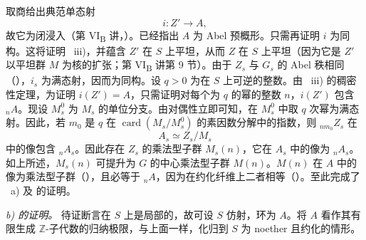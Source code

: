 取商给出典范单态射
\[
  i:Z'\longrightarrow A,
\]
故它为闭浸入（第 VI\textsubscript{B} 讲，）。已经指出 \(A\) 为 Abel 预概形。只需再证明 \(i\) 为同构。这将证明 ~iii)，并蕴含 \(Z'\) 在 \(S\) 上平坦，从而 \(Z\) 在 \(S\) 上平坦（因为它是 \(Z'\) 以平坦群 \(M\) 为核的扩张；第 VI\textsubscript{B} 讲第 9 节）。由于 \(Z_s\) 与 \(G_s\) 的 Abel 秩相同（），\(i_s\) 为满态射，因而为同构。设 \(q>0\) 为在 \(S\) 上可逆的整数。由 ~iii) 的稠密性定理，为证明 \(i(Z')=A\)，只需证明对每个为 \(q\) 的幂的整数 \(n\)，\(i(Z')\) 包含 \({}_nA\)。现设 \(M_s^0\) 为 \(M_s\) 的单位分支。由对偶性立即可知，在 \(M_s^0\) 中取 \(q\) 次幂为满态射。因此，若 \(m_0\) 是 \(q\) 在 \(\operatorname{card}(M_s/M_s^0)\) 的素因数分解中的指数，则 \({}_{nm_0}Z_s\) 在
\[
  A_s\simeq Z_s/M_s
\]
中的像包含 \({}_nA_s\)。因此存在 \(Z_s\) 的乘法型子群 \(M_s(n)\)，它在 \(A_s\) 中的像为 \({}_nA_s\)。如上所述，\(M_s(n)\) 可提升为 \(G\) 的中心乘法型子群 \(M(n)\)。\(M(n)\) 在 \(A\) 中的像为乘法型子群（），且必等于 \({}_nA\)，因为在约化纤维上二者相等（）。至此完成了 ~a) 及  的证明。

\medskip
\noindent\textit{ b) 的证明。}
待证断言在 \(S\) 上是局部的，故可设 \(S\) 仿射，环为 \(A\)。将 \(A\) 看作其有限生成 \(\mathbb Z\)-子代数的归纳极限，与上面一样，化归到 \(S\) 为 noether 且约化的情形。

